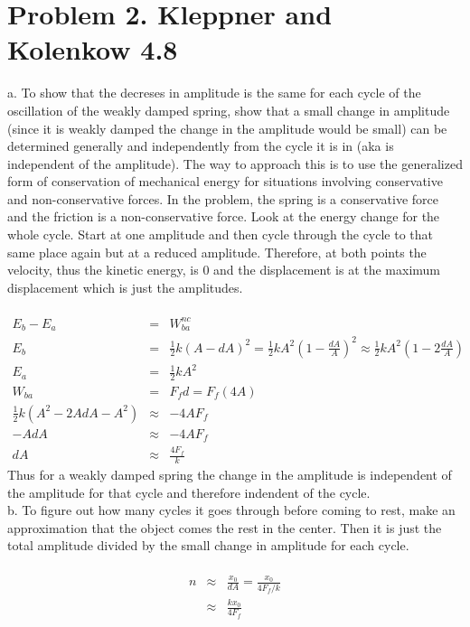 \documentclass[11pt]{amsart}
\begin{document}
\section{Problem 2. Kleppner and Kolenkow 4.8}
a. To show that the decreses in amplitude is the same for each cycle of the oscillation of the weakly damped spring, show that a small change in amplitude (since it is weakly damped the change in the amplitude would be small) can be determined generally and independently from the cycle it is in (aka is independent of the amplitude). The way to approach this is to use the generalized form of conservation of mechanical energy for situations involving conservative and non-conservative forces. In the problem, the spring is a conservative force and the friction is a non-conservative force. Look at the energy change for the whole cycle. Start at one amplitude and then cycle through the cycle to that same place again but at a reduced amplitude. Therefore, at  both points the velocity, thus the kinetic energy, is 0 and the displacement is at the maximum displacement which is just the amplitudes.\\ \\
\begin{eqnarray*} 
E_{b}-E_{a} &=& W_{ba}^{nc} \\
E_{b} &=& \frac{1}{2}k(A-dA)^{2} = \frac{1}{2}kA^{2}\left(1-\frac{dA}{A}\right)^{2} \approx \frac{1}{2}kA^{2}\left(1-2\frac{dA}{A}\right)\\
E_{a} &=& \frac{1}{2}kA^{2} \\
W_{ba} &=& F_{f}d = F_{f}(4A) \\
\frac{1}{2}k(A^{2}-2AdA-A^{2}) &\approx& -4AF_{f} \\
-AdA &\approx& -4AF_{f} \\
dA &\approx& \frac{4F_{f}}{k} 
\end{eqnarray*} 
Thus for a weakly damped spring the change in the amplitude is independent of the amplitude for that cycle and therefore indendent of the cycle. \\ 
b. To figure out how many cycles it goes through before coming to rest, make an approximation that the object comes the rest in the center. Then it is just the total amplitude divided by the small change in amplitude for each cycle. \\ \\
\begin{eqnarray*}
n &\approx& \frac{x_{0}}{dA} = \frac{x_{0}}{4F_{f}/k} \\
&\approx& \frac{kx_{0}}{4F_{f}} 
\end{eqnarray*} \\
\end{document}
